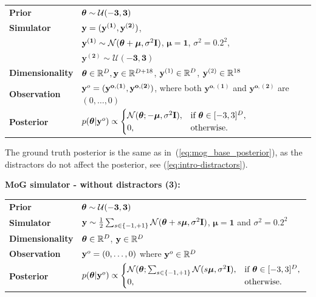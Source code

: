 \begin{tabular}{@{}ll@{}}
  \textbf{Prior} & $\boldsymbol{\theta} \sim \mathcal{U}(-\mathbf{3}, \mathbf{3})$ \\ [5pt]
  \textbf{Simulator} & $\mathbf{y} = (\mathbf{y^{(1)}}, \mathbf{y^{(2)}})$, \\ [5pt]
  & $\mathbf{y^{(1)}} \sim \mathcal{N}(\boldsymbol{\theta} + \boldsymbol{\mu}, \sigma^2 \mathbf{I})$, $\boldsymbol{\mu} = \mathbf{1}$, $\sigma^2=0.2^2$, \\ [5pt]
  & $\mathbf{y^{(2)}} \sim \mathcal{U}(\mathbf{-3}, \mathbf{3})$ \\ [5pt]
  \textbf{Dimensionality} & $\boldsymbol{\theta} \in \mathbb{R}^D,  \mathbf{y} \in \mathbb{R}^{D + 18}$, $\mathbf{y}^{(1)} \in \mathbb{R}^{D}$, $\mathbf{y}^{(2)} \in \mathbb{R}^{18}$\\ [5pt]
  \textbf{Observation} & $\mathbf{y}^o = (\mathbf{y^{o, (1)}}, \mathbf{y^{o, (2)}})$, where both $\mathbf{y^{o, (1)}}$ and $\mathbf{y^{o, (2)}}$  are $(0, \ldots, 0) $ \\ [5pt]
  \textbf{Posterior} & $ p(\boldsymbol{\theta} | \mathbf{y}^o) \propto
                                    \begin{cases}
                                      \mathcal{N}(\boldsymbol{\theta}; -\boldsymbol{\mu}, \sigma^2 \mathbf{I}), & \text{if } \boldsymbol{\theta} \in [-3, 3]^D, \\
                                      0, & \text{otherwise}.
                                    \end{cases} $ \\ [5pt]
\end{tabular}

The ground truth posterior is the same as in~(\ref{eq:mog_base_posterior}), as the distractors do not affect the posterior, see (\ref{eq:intro-distractors}).

\textbf{MoG simulator - without distractors (3):}

\begin{tabular}{@{}ll@{}}
  \textbf{Prior} & $\boldsymbol{\theta} \sim \mathcal{U}(-\mathbf{3}, \mathbf{3})$ \\ [5pt]
  \textbf{Simulator} & $\mathbf{y} \sim \frac{1}{2} \sum_{s \in \{-1, +1\}} \mathcal{N}(\boldsymbol{\theta} + s\boldsymbol{\mu}, \sigma^2\mathbf{I})$, $\boldsymbol{\mu} = \mathbf{1}$ and $\sigma^2=0.2^2$ \\ [5pt]
  \textbf{Dimensionality} & $\boldsymbol{\theta} \in \mathbb{R}^{D}$, $\mathbf{y} \in \mathbb{R}^{D}$ \\ [5pt]
  \textbf{Observation} & $\mathbf{y}^o = (0, \ldots, 0)$ where $\mathbf{y}^o \in \mathbb{R}^D$ \\ [5pt]
  \textbf{Posterior} & $ p(\boldsymbol{\theta} | \mathbf{y}^o) \propto
                                    \begin{cases}
                                      \mathcal{N}(\boldsymbol{\theta}; \sum_{s \in \{-1, +1\}} \mathcal{N}(s\boldsymbol{\mu}, \sigma^2 \mathbf{I}), & \text{if } \boldsymbol{\theta} \in [-3, 3]^D, \\
                                      0, & \text{otherwise}.
                                    \end{cases} $ \\ [5pt]
\end{tabular}

